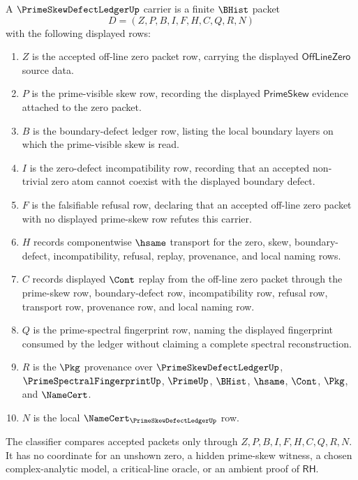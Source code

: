\begin{definition}
\label{def:prime-skew-defect-ledger-carrier}
A $\PrimeSkewDefectLedgerUp$ carrier is a finite $\BHist$ packet
$$
D=(Z,P,B,I,F,H,C,Q,R,N)
$$
with the following displayed rows:
\begin{enumerate}
\item $Z$ is the accepted off-line zero packet row, carrying the displayed $\mathsf{OffLineZero}$ source data.
\item $P$ is the prime-visible skew row, recording the displayed $\mathsf{PrimeSkew}$ evidence attached to the zero packet.
\item $B$ is the boundary-defect ledger row, listing the local boundary layers on which the prime-visible skew is read.
\item $I$ is the zero-defect incompatibility row, recording that an accepted non-trivial zero atom cannot coexist with the displayed boundary defect.
\item $F$ is the falsifiable refusal row, declaring that an accepted off-line zero packet with no displayed prime-skew row refutes this carrier.
\item $H$ records componentwise $\hsame$ transport for the zero, skew, boundary-defect, incompatibility, refusal, replay, provenance, and local naming rows.
\item $C$ records displayed $\Cont$ replay from the off-line zero packet through the prime-skew row, boundary-defect row, incompatibility row, refusal row, transport row, provenance row, and local naming row.
\item $Q$ is the prime-spectral fingerprint row, naming the displayed fingerprint consumed by the ledger without claiming a complete spectral reconstruction.
\item $R$ is the $\Pkg$ provenance over $\PrimeSkewDefectLedgerUp$, $\PrimeSpectralFingerprintUp$, $\PrimeUp$, $\BHist$, $\hsame$, $\Cont$, $\Pkg$, and $\NameCert$.
\item $N$ is the local $\NameCert_{\PrimeSkewDefectLedgerUp}$ row.
\end{enumerate}
The classifier compares accepted packets only through $Z,P,B,I,F,H,C,Q,R,N$. It has no coordinate for an unshown zero, a hidden prime-skew witness, a chosen complex-analytic model, a critical-line oracle, or an ambient proof of $\mathsf{RH}$.
\end{definition}

